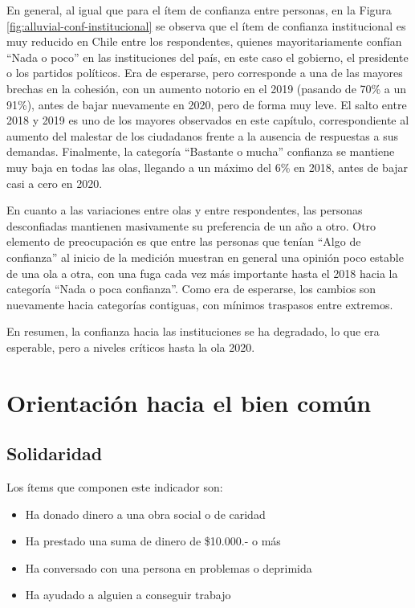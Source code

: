 \documentclass[
  12pt,
]{book}
\begin{document}
En general, al igual que para el ítem de confianza entre personas, en la Figura \ref{fig:alluvial-conf-institucional} se observa que el ítem de confianza institucional es muy reducido en Chile entre los respondentes, quienes mayoritariamente confían ``Nada o poco'' en las instituciones del país, en este caso el gobierno, el presidente o los partidos políticos. Era de esperarse, pero corresponde a una de las mayores brechas en la cohesión, con un aumento notorio en el 2019 (pasando de 70\% a un 91\%), antes de bajar nuevamente en 2020, pero de forma muy leve. El salto entre 2018 y 2019 es uno de los mayores observados en este capítulo, correspondiente al aumento del malestar de los ciudadanos frente a la ausencia de respuestas a sus demandas. Finalmente, la categoría ``Bastante o mucha'' confianza se mantiene muy baja en todas las olas, llegando a un máximo del 6\% en 2018, antes de bajar casi a cero en 2020.

En cuanto a las variaciones entre olas y entre respondentes, las personas desconfiadas mantienen masivamente su preferencia de un año a otro. Otro elemento de preocupación es que entre las personas que tenían ``Algo de confianza'' al inicio de la medición muestran en general una opinión poco estable de una ola a otra, con una fuga cada vez más importante hasta el 2018 hacia la categoría ``Nada o poca confianza''. Como era de esperarse, los cambios son nuevamente hacia categorías contiguas, con mínimos traspasos entre extremos.

En resumen, la confianza hacia las instituciones se ha degradado, lo que era esperable, pero a niveles críticos hasta la ola 2020.

\hypertarget{orientaciuxf3n-hacia-el-bien-comuxfan-1}{%
\section{Orientación hacia el bien común}\label{orientaciuxf3n-hacia-el-bien-comuxfan-1}}

\hypertarget{solidaridad}{%
\subsection{Solidaridad}\label{solidaridad}}

Los ítems que componen este indicador son:

\begin{itemize}
\item
  Ha donado dinero a una obra social o de caridad
\item
  Ha prestado una suma de dinero de \$10.000.- o más
\item
  Ha conversado con una persona en problemas o deprimida
\item
  Ha ayudado a alguien a conseguir trabajo
\end{itemize}
\end{document}
